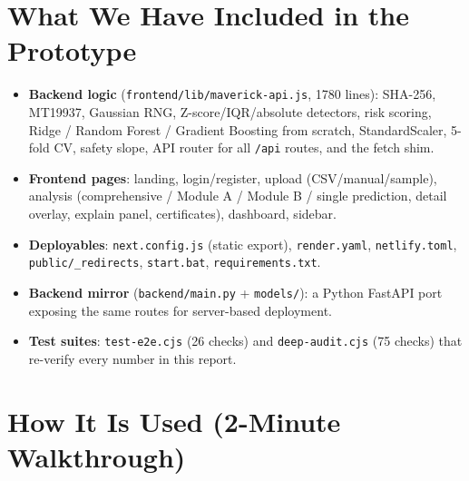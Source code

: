 \documentclass[11pt,a4paper]{article}
\newcommand{\code}[1]{\texttt{\small #1}}
\newcommand{\answerbox}[2]{\par\vspace{0.8em}\noindent
  \begin{tcolorbox}[colback=isroblue!6,colframe=isroblue,
    title={\sffamily\bfseries\color{white}#1},arc=2pt,boxrule=1.2pt]
    #2
  \end{tcolorbox}\par\vspace{0.4em}}
\begin{document}
\section{What We Have Included in the Prototype}

\answerbox{Complete artefact inventory}{
  \begin{itemize}[leftmargin=1.5em]
    \item \textbf{Backend logic} (\code{frontend/lib/maverick-api.js}, 1780 lines): SHA-256,
          MT19937, Gaussian RNG, Z-score/IQR/absolute detectors, risk scoring, Ridge / Random Forest /
          Gradient Boosting from scratch, StandardScaler, 5-fold CV, safety slope, API router for all
          \code{/api} routes, and the fetch shim.
    \item \textbf{Frontend pages}: landing, login/register, upload (CSV/manual/sample),
          analysis (comprehensive / Module A / Module B / single prediction, detail overlay,
          explain panel, certificates), dashboard, sidebar.
    \item \textbf{Deployables}: \code{next.config.js} (static export), \code{render.yaml},
          \code{netlify.toml}, \code{public/\_redirects}, \code{start.bat}, \code{requirements.txt}.
    \item \textbf{Backend mirror} (\code{backend/main.py} + \code{models/}): a Python FastAPI
          port exposing the same routes for server-based deployment.
    \item \textbf{Test suites}: \code{test-e2e.cjs} (26 checks) and \code{deep-audit.cjs}
          (75 checks) that re-verify every number in this report.
  \end{itemize}
}

\section{How It Is Used (2-Minute Walkthrough)}
\end{document}
